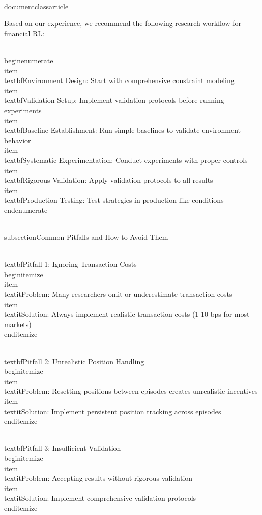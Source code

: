 \\documentclass{article}
\begin{document}
Based on our experience, we recommend the following research workflow for financial RL:

\\begin{enumerate}
\\item \\textbf{Environment Design}: Start with comprehensive constraint modeling
\\item \\textbf{Validation Setup}: Implement validation protocols before running experiments
\\item \\textbf{Baseline Establishment}: Run simple baselines to validate environment behavior
\\item \\textbf{Systematic Experimentation}: Conduct experiments with proper controls
\\item \\textbf{Rigorous Validation}: Apply validation protocols to all results
\\item \\textbf{Production Testing}: Test strategies in production-like conditions
\\end{enumerate}

\\subsection{Common Pitfalls and How to Avoid Them}

\\textbf{Pitfall 1: Ignoring Transaction Costs}
\\begin{itemize}
\\item \\textit{Problem}: Many researchers omit or underestimate transaction costs
\\item \\textit{Solution}: Always implement realistic transaction costs (1-10 bps for most markets)
\\end{itemize}

\\textbf{Pitfall 2: Unrealistic Position Handling}
\\begin{itemize}
\\item \\textit{Problem}: Resetting positions between episodes creates unrealistic incentives
\\item \\textit{Solution}: Implement persistent position tracking across episodes
\\end{itemize}

\\textbf{Pitfall 3: Insufficient Validation}
\\begin{itemize}
\\item \\textit{Problem}: Accepting results without rigorous validation
\\item \\textit{Solution}: Implement comprehensive validation protocols
\\end{itemize}
\end{document}
